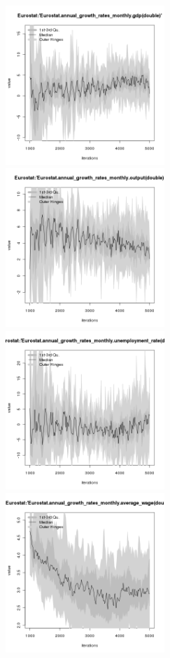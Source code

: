 \begin{figure}[H!]
\centering\leavevmode
\begin{minipage}{14cm}
\centering\leavevmode
\includegraphics[width=6cm]{./png/tax_0.10/Eurostat-annual_growth_rates_monthly_gdp.png}
\includegraphics[width=6cm]{./png/tax_0.10/Eurostat-annual_growth_rates_monthly_output.png}\\
\includegraphics[width=6cm]{./png/tax_0.10/Eurostat-annual_growth_rates_monthly_unemployment_rate.png}
\includegraphics[width=6cm]{./png/tax_0.10/Eurostat-annual_growth_rates_monthly_average_wage.png}

\end{minipage}
\end{figure}
